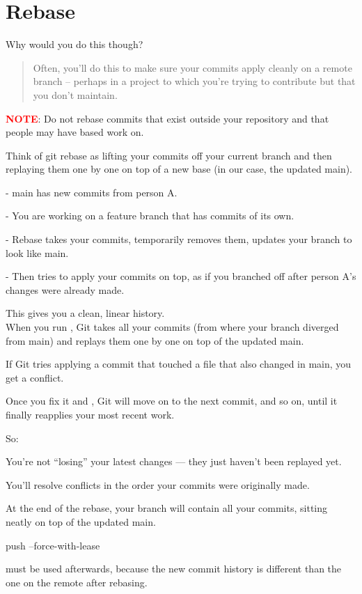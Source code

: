 \section{Rebase}
Why would you do this though?
\begin{quote}
    Often, you'll do this to make sure your commits apply cleanly on a remote branch -- perhaps in a project to which you're trying to contribute but that you don't maintain.
\end{quote}

\begin{tcolorbox}[infoBox]
        \textcolor{red}{\textbf{NOTE}}: Do not rebase commits that exist outside your repository and that people may have based work on.
\end{tcolorbox}

Think of git rebase as lifting your commits off your current branch and then replaying them one by one on top of a new base (in our case, the updated main).

- main has new commits from person A.

- You are working on a feature branch that has commits of its own.

- Rebase takes your commits, temporarily removes them, updates your branch to look like main.

- Then tries to apply your commits on top, as if you branched off after person A's changes were already made.

This gives you a clean, linear history.\\

When you run , Git takes all your commits (from where your branch diverged from main) and replays them one by one on top of the updated main.

If Git tries applying a commit that touched a file that also changed in main, you get a conflict.

Once you fix it and , Git will move on to the next commit, and so on, until it finally reapplies your most recent work.

So:

You're not “losing” your latest changes — they just haven't been replayed yet.

You'll resolve conflicts in the order your commits were originally made.

At the end of the rebase, your branch will contain all your commits, sitting neatly on top of the updated main.

\begin{gitBashBox}
push --force-with-lease 
\end{gitBashBox}
must be used afterwards, because the new commit history is different than the one on the remote after rebasing.

